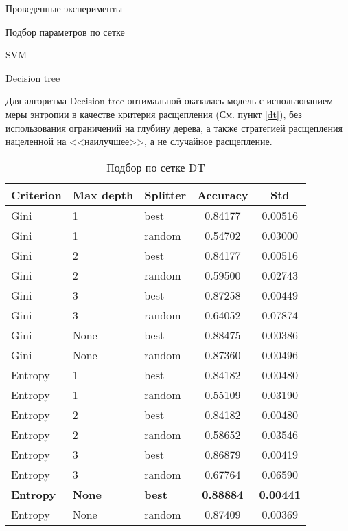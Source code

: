 \begin{section}{Проведенные эксперименты}
\begin{subsection}{Подбор параметров по сетке}
\begin{subsubsection}{SVM}
\end{subsubsection}

\begin{subsubsection}{Decision tree}

Для алгоритма Decision tree оптимальной оказалась модель с использованием меры энтропии в качестве критерия расщепления (См. пункт \ref{dt}), без использования ограничений на глубину дерева, а также стратегией расщепления нацеленной на <<наилучшее>>, а не случайное расщепление.


\begin{table}[H]
\centering
{\begin{tabular}{|l|l|l|c|c|}
\hline
\textbf{Criterion} & \textbf{Max depth} & \textbf{Splitter} & \textbf{Accuracy} & \textbf{Std} \\
\hline
Gini & 1  & best & 0.84177 & 0.00516 \\
\hline
Gini & 1  & random &  0.54702 & 0.03000 \\
\hline
Gini & 2  & best & 0.84177 & 0.00516 \\
\hline
Gini &  2 & random  & 0.59500 & 0.02743 \\
\hline
Gini & 3  & best & 0.87258 & 0.00449 \\
\hline
Gini & 3  & random & 0.64052 & 0.07874 \\
\hline
Gini & None  & best & 0.88475 & 0.00386 \\
\hline
Gini &  None & random  & 0.87360 & 0.00496 \\
\hline
Entropy & 1  & best & 0.84182 & 0.00480 \\
\hline
Entropy & 1  & random & 0.55109 & 0.03190 \\
\hline
Entropy  & 2  & best & 0.84182 & 0.00480 \\
\hline
Entropy  &  2 & random  & 0.58652 & 0.03546 \\
\hline
Entropy  & 3  & best &  0.86879 & 0.00419 \\
\hline
Entropy  & 3  & random & 0.67764 & 0.06590 \\
\hline
\textbf{Entropy} & \textbf{None}  & \textbf{best} & \textbf{0.88884} & \textbf{0.00441} \\
\hline
Entropy &  None & random  & 0.87409 & 0.00369 \\
\hline
\end{tabular}}

\caption{Подбор по сетке DT}
\label{grid:dt}
\end{table}


\end{subsubsection}



\end{subsection}
\end{section}
